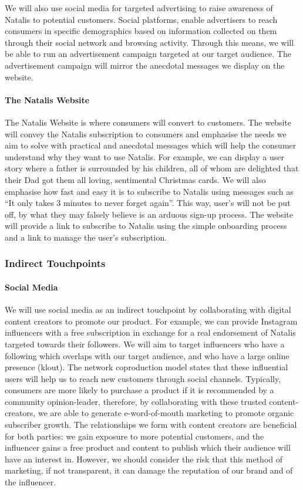 \documentclass[10pt,a4paper]{article}
\begin{document}
We will also use social media for targeted advertising to raise awareness of Natalis to potential customers. Social platforms, enable advertisers to reach consumers in specific demographics based on information collected on them through their social network and browsing activity. Through this means, we will be able to run an advertisement campaign targeted at our target audience. The advertisement campaign will mirror the anecdotal messages we display on the website.

\paragraph*{The Natalis Website}
The Natalis Website is where consumers will convert to customers. The website will convey the Natalis subscription to consumers and emphasise the needs we aim to solve with practical and anecdotal messages which will help the consumer understand why they want to use Natalis. For example, we can display a user story where a father is surrounded by his children, all of whom are delighted that their Dad got them all loving, sentimental Christmas cards. We will also emphasise how fast and easy it is to subscribe to Natalis using messages such as ``It only takes 3 minutes to never forget again''. This way, user's will not be put off, by what they may falsely believe is an arduous sign-up process. The website will provide a link to subscribe to Natalis using the simple onboarding process and a link to manage the user's subscription.

\subsubsection*{Indirect Touchpoints}
\paragraph*{Social Media}
We will use social media as an indirect touchpoint by collaborating with digital content creators to promote our product. For example, we can provide Instagram influencers with a free subscription in exchange for a real endorsement of Natalis targeted towards their followers. We will aim to target influencers who have a following which overlaps with our target audience, and who have a large online presence (klout). The network coproduction model states that these influential users will help us to reach new customers through social channels. Typically, consumers are more likely to purchase a product if it is recommended by a community opinion-leader, therefore, by collaborating with these trusted content-creators, we are able to generate e-word-of-mouth marketing to promote organic subscriber growth. The relationships we form with content creators are beneficial for both parties: we gain exposure to more potential customers, and the influencer gains a free product and content to publish which their audience will have an interest in. However, we should consider the risk that this method of marketing, if not transparent, it can damage the reputation of our brand and of the influencer.
\end{document}
